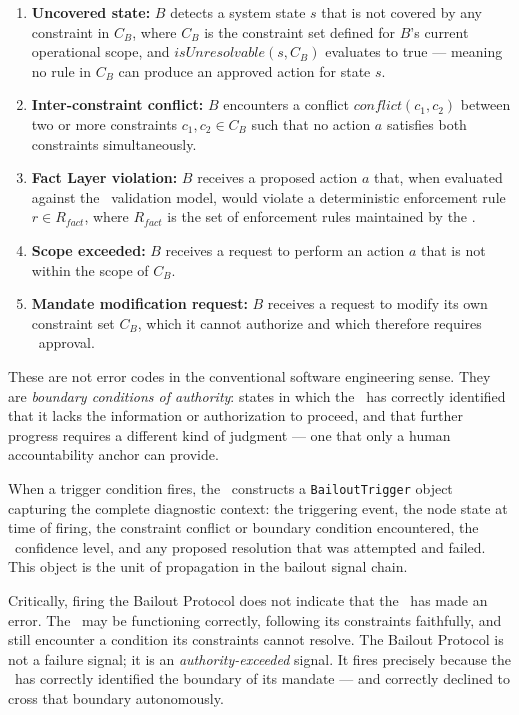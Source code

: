 \begin{enumerate}
\item \textbf{Uncovered state:} $B$ detects a system state $s$ that is not covered by any constraint in $C_B$, where $C_B$ is the constraint set defined for $B$'s current operational scope, and $isUnresolvable(s, C_B)$ evaluates to true --- meaning no rule in $C_B$ can produce an approved action for state $s$.

\item \textbf{Inter-constraint conflict:} $B$ encounters a conflict $conflict(c_1, c_2)$ between two or more constraints $c_1, c_2 \in C_B$ such that no action $a$ satisfies both constraints simultaneously.

\item \textbf{Fact Layer violation:} $B$ receives a proposed action $a$ that, when evaluated against the \fact\ validation model, would violate a deterministic enforcement rule $r \in R_{fact}$, where $R_{fact}$ is the set of enforcement rules maintained by the \fact.

\item \textbf{Scope exceeded:} $B$ receives a request to perform an action $a$ that is not within the scope of $C_B$.

\item \textbf{Mandate modification request:} $B$ receives a request to modify its own constraint set $C_B$, which it cannot authorize and which therefore requires \purpose\ approval.
\end{enumerate}

These are not error codes in the conventional software engineering sense. They are \textit{boundary conditions of authority}: states in which the \bounds\ has correctly identified that it lacks the information or authorization to proceed, and that further progress requires a different kind of judgment --- one that only a human accountability anchor can provide.

When a trigger condition fires, the \bounds\ constructs a \texttt{BailoutTrigger} object capturing the complete diagnostic context: the triggering event, the node state at time of firing, the constraint conflict or boundary condition encountered, the \bounds\ confidence level, and any proposed resolution that was attempted and failed. This object is the unit of propagation in the bailout signal chain.

Critically, firing the Bailout Protocol does not indicate that the \bounds\ has made an error. The \bounds\ may be functioning correctly, following its constraints faithfully, and still encounter a condition its constraints cannot resolve. The Bailout Protocol is not a failure signal; it is an \textit{authority-exceeded} signal. It fires precisely because the \bounds\ has correctly identified the boundary of its mandate --- and correctly declined to cross that boundary autonomously.

